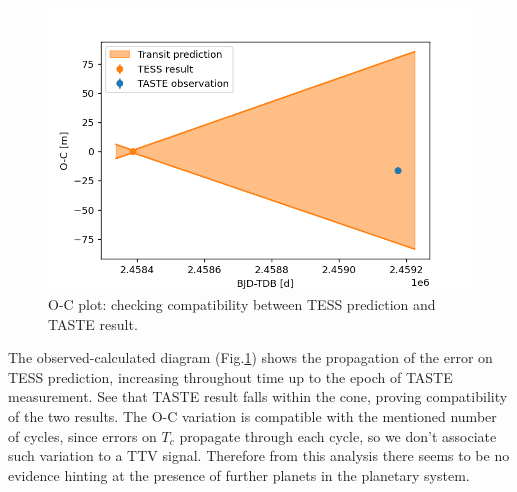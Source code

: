 \documentclass{aa}
\begin{document}
\begin{figure}[h]
  \centering
    \includegraphics[scale=0.3, angle=0]{pictures/oc.png}
    \caption{O-C plot: checking compatibility between TESS prediction and TASTE result.}
    \label{fig:ocplot}
\end{figure}
The observed-calculated diagram (Fig.\ref{fig:ocplot}) shows the propagation of the error on TESS prediction,
increasing throughout time up to the epoch of TASTE measurement. See 
that TASTE result falls within the cone, proving compatibility of the 
two results. The O-C variation is compatible with the mentioned number of cycles, since errors on $T_c$ propagate through each cycle, so we don't associate such variation to a TTV signal. Therefore from this analysis there seems to be no evidence hinting at the presence of further planets in the planetary system.
\end{document}
